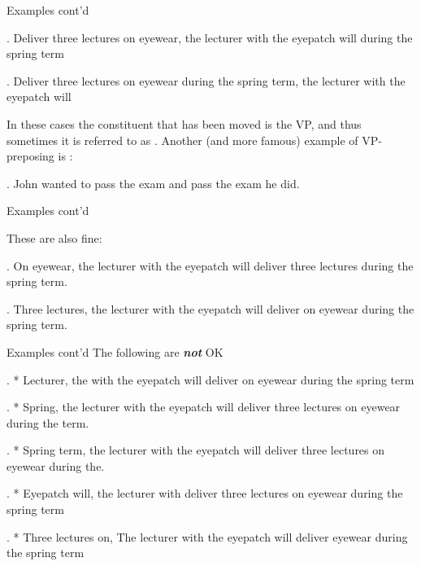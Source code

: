 \begin{frame}
{Examples cont'd}


\ex.
Deliver three lectures on eyewear, the lecturer with the eyepatch will during the spring term

\pause

\ex.
Deliver three lectures on eyewear during the spring term, the lecturer with the eyepatch will 


\pause

In these cases the constituent that has been moved is the VP, and thus sometimes it is referred to as .  Another (and more famous) example of VP-preposing is :

\ex. 
John wanted to pass the exam and pass the exam he did.

\end{frame}
\begin{frame}
{Examples cont'd}

These are also fine:

\pause

\ex.
On eyewear, the lecturer with the eyepatch will deliver three lectures during the spring term.


\pause

\ex.
Three lectures, the lecturer with the eyepatch will deliver on eyewear during the spring term.


\end{frame}

\begin{frame}
  {Examples cont'd}
The following are \textbf{\textit{not}} OK

\pause

\ex. 
* Lecturer, the with the eyepatch will deliver on eyewear during the spring term


\pause

\ex.
* Spring, the lecturer with the eyepatch will deliver three lectures on eyewear during the term.


\pause

\ex.
* Spring term, the lecturer with the eyepatch will deliver three lectures on eyewear during the.

\pause

\ex.
* Eyepatch will, the lecturer with deliver three lectures on eyewear during the spring term


\pause

\ex.
* Three lectures on, The lecturer with the eyepatch will deliver eyewear during the spring term  


\end{frame}


